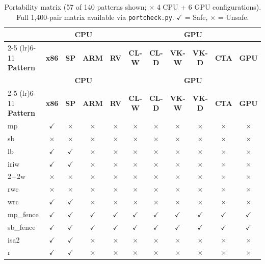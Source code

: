 \documentclass[11pt]{article}
\newcommand{\cmark}{$\checkmark$}
\newcommand{\xmark}{$\times$}
\begin{document}
{\tiny
\begin{longtable}{l cccc cccccc}
\caption{Portability matrix (57 of 140 patterns shown; $\times$ 4 CPU + 6 GPU
configurations). Full 1{,}400-pair matrix available via \texttt{portcheck.py}. \cmark{} = Safe, \xmark{} = Unsafe.}
\label{tab:full-matrix-1} \\
\toprule
& \multicolumn{4}{c}{\textbf{CPU}} & \multicolumn{6}{c}{\textbf{GPU}} \\
\cmidrule(lr){2-5} \cmidrule(lr){6-11}
\textbf{Pattern} & \textbf{x86} & \textbf{SP} & \textbf{ARM} & \textbf{RV}
& \textbf{CL-W} & \textbf{CL-D} & \textbf{VK-W} & \textbf{VK-D} & \textbf{CTA} & \textbf{GPU} \\
\midrule
\endfirsthead
\toprule
& \multicolumn{4}{c}{\textbf{CPU}} & \multicolumn{6}{c}{\textbf{GPU}} \\
\cmidrule(lr){2-5} \cmidrule(lr){6-11}
\textbf{Pattern} & \textbf{x86} & \textbf{SP} & \textbf{ARM} & \textbf{RV}
& \textbf{CL-W} & \textbf{CL-D} & \textbf{VK-W} & \textbf{VK-D} & \textbf{CTA} & \textbf{GPU} \\
\midrule
\endhead
mp & \cmark & \xmark & \xmark & \xmark & \xmark & \xmark & \xmark & \xmark & \xmark & \xmark \\
sb & \xmark & \xmark & \xmark & \xmark & \xmark & \xmark & \xmark & \xmark & \xmark & \xmark \\
lb & \cmark & \cmark & \xmark & \xmark & \xmark & \xmark & \xmark & \xmark & \xmark & \xmark \\
iriw & \cmark & \cmark & \xmark & \xmark & \xmark & \xmark & \xmark & \xmark & \xmark & \xmark \\
2+2w & \xmark & \xmark & \xmark & \xmark & \xmark & \xmark & \xmark & \xmark & \xmark & \xmark \\
rwc & \xmark & \xmark & \xmark & \xmark & \xmark & \xmark & \xmark & \xmark & \xmark & \xmark \\
wrc & \cmark & \cmark & \xmark & \xmark & \xmark & \xmark & \xmark & \xmark & \xmark & \xmark \\
mp\_fence & \cmark & \cmark & \cmark & \cmark & \cmark & \cmark & \cmark & \cmark & \cmark & \cmark \\
sb\_fence & \cmark & \cmark & \cmark & \cmark & \cmark & \cmark & \cmark & \cmark & \cmark & \cmark \\
isa2 & \cmark & \cmark & \xmark & \xmark & \xmark & \xmark & \xmark & \xmark & \xmark & \xmark \\
r & \cmark & \cmark & \xmark & \xmark & \xmark & \xmark & \xmark & \xmark & \xmark & \xmark \\

\end{longtable}}
\end{document}
